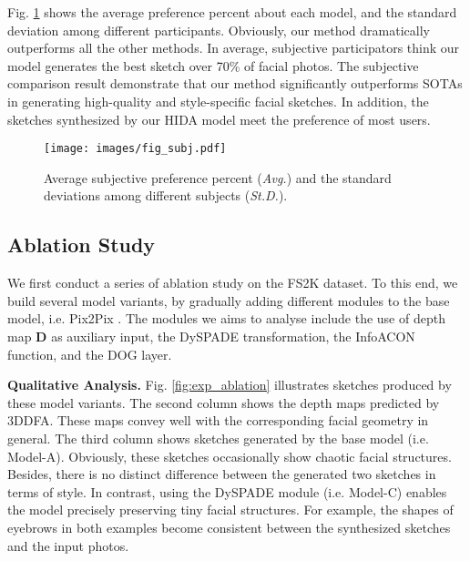 \documentclass[10pt,twocolumn,letterpaper]{article}
\begin{document}
Fig. \ref{fig:subject} shows the average preference percent about each model, and the standard deviation among different participants. Obviously, our method dramatically outperforms all the other methods. In average, subjective participators think our model generates the best sketch over 70\% of facial photos. 
The subjective comparison result demonstrate that our method significantly outperforms SOTAs in generating high-quality and style-specific facial sketches. In addition, the sketches synthesized by our HIDA model meet the preference of most users.  


	
\begin{figure}
\centering
\texttt{[image: images/fig\_subj.pdf]}
\caption{Average subjective preference percent  (\textit{Avg.}) and the standard deviations among different subjects (\textit{St.D.}).}
\label{fig:subject}
\end{figure}




\subsection{Ablation Study}
\label{ssec:exp_ablation}

We first conduct a series of ablation study on the FS2K dataset. To this end, we build several model variants, by gradually adding different modules to the base model, i.e. Pix2Pix \cite{Isola2017Pix2Pix}. The modules we aims to analyse include the use of depth map $\mathbf{D}$ as auxiliary input, the DySPADE transformation, the InfoACON function, and the DOG layer. 


\textbf{Qualitative Analysis.}
Fig. \ref{fig:exp_ablation} illustrates sketches produced by these model variants. 
The second column shows the depth maps predicted by 3DDFA. These maps convey well with the corresponding facial geometry in general. 
The third column shows sketches generated by the base model (i.e. Model-A). Obviously, these sketches occasionally show chaotic facial structures. Besides, there is no distinct difference between the generated two sketches in terms of style.  
In contrast, using the DySPADE module (i.e. Model-C) enables the model precisely preserving tiny facial structures. For example, the shapes of eyebrows in both examples become consistent between the synthesized sketches and the input photos. %
\end{document}
